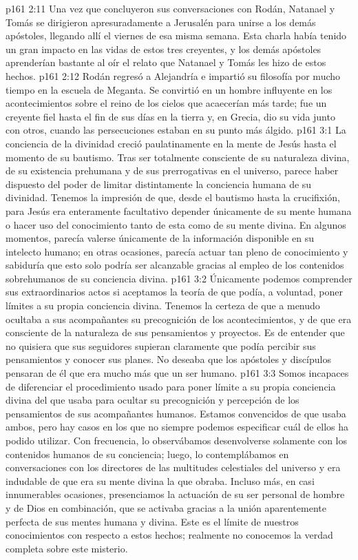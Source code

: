 \vs p161 2:11 \pc Una vez que concluyeron sus conversaciones con Rodán, Natanael y Tomás se dirigieron apresuradamente a Jerusalén para unirse a los demás apóstoles, llegando allí el viernes de esa misma semana. Esta charla había tenido un gran impacto en las vidas de estos tres creyentes, y los demás apóstoles aprenderían bastante al oír el relato que Natanael y Tomás les hizo de estos hechos.
\vs p161 2:12 Rodán regresó a Alejandría e impartió su filosofía por mucho tiempo en la escuela de Meganta. Se convirtió en un hombre influyente en los acontecimientos sobre el reino de los cielos que acaecerían más tarde; fue un creyente fiel hasta el fin de sus días en la tierra y, en Grecia, dio su vida junto con otros, cuando las persecuciones estaban en su punto más álgido.
\vs p161 3:1 La conciencia de la divinidad creció paulatinamente en la mente de Jesús hasta el momento de su bautismo. Tras ser totalmente consciente de su naturaleza divina, de su existencia prehumana y de sus prerrogativas en el universo, parece haber dispuesto del poder de limitar distintamente la conciencia humana de su divinidad. Tenemos la impresión de que, desde el bautismo hasta la crucifixión, para Jesús era enteramente facultativo depender únicamente de su mente humana o hacer uso del conocimiento tanto de esta como de su mente divina. En algunos momentos, parecía valerse únicamente de la información disponible en su intelecto humano; en otras ocasiones, parecía actuar tan pleno de conocimiento y sabiduría que esto solo podría ser alcanzable gracias al empleo de los contenidos sobrehumanos de su conciencia divina.
\vs p161 3:2 Únicamente podemos comprender sus extraordinarios actos si aceptamos la teoría de que podía, a voluntad, poner límites a su propia conciencia divina. Tenemos la certeza de que a menudo ocultaba a sus acompañantes su precognición de los acontecimientos, y de que era consciente de la naturaleza de sus pensamientos y proyectos. Es de entender que no quisiera que sus seguidores supieran claramente que podía percibir sus pensamientos y conocer sus planes. No deseaba que los apóstoles y discípulos pensaran de él que era mucho más que un ser humano.
\vs p161 3:3 Somos incapaces de diferenciar el procedimiento usado para poner límite a su propia conciencia divina del que usaba para ocultar su precognición y percepción de los pensamientos de sus acompañantes humanos. Estamos convencidos de que usaba ambos, pero hay casos en los que no siempre podemos especificar cuál de ellos ha podido utilizar. Con frecuencia, lo observábamos desenvolverse solamente con los contenidos humanos de su conciencia; luego, lo contemplábamos en conversaciones con los directores de las multitudes celestiales del universo y era indudable de que era su mente divina la que obraba. Incluso más, en casi innumerables ocasiones, presenciamos la actuación de su ser personal de hombre y de Dios en combinación, que se activaba gracias a la unión aparentemente perfecta de sus mentes humana y divina. Este es el límite de nuestros conocimientos con respecto a estos hechos; realmente no conocemos la verdad completa sobre este misterio.
